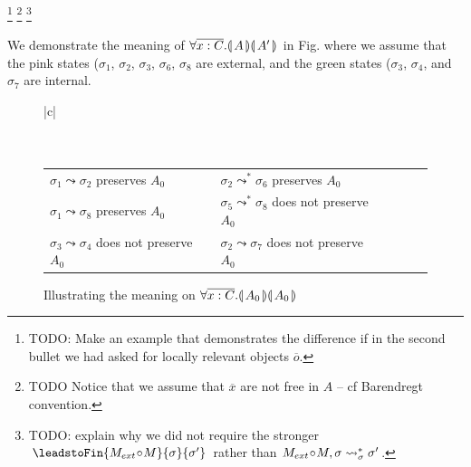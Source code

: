   
\footnote{{TODO: Make an example that demonstrates the difference if in the second bullet we had asked for locally relevant objects ${\overline o}$.}}
\footnote{{TODO Notice that we assume that $\overline x$ are not free in $A$ -- cf Barendregt convention.}}
\footnote{TODO: explain why we did not require the stronger $\leadstoFin{M_{ext}\!\circ \!M}{\sigma}{\sigma'}$ rather than $M_{ext}\!\circ \!M, \sigma \leadsto^*_{\sigma} \sigma'$.}



{We demonstrate the meaning of ${\forall {\overline {x:C}}.{\llparenthesis}\, A \,{\rrparenthesis}{\llparenthesis}\, A' \,{\rrparenthesis}}$ in Fig. where we assume that the pink states (\ie   ${\sigma_1}$, 
 ${\sigma_2}$,  ${\sigma_3}$,  ${\sigma_6}$,  ${\sigma_8}$ are external, and the green states (\ie   ${\sigma_3}$, 
 ${\sigma_4}$,  and ${\sigma_7}$ are internal.}
 
 \begin{figure}[htb]
\begin{tabular}{|c|}
\hline \\
\\
\hline
\\
\begin{tabular}{lclclcl} 
$ {\sigma_1} \leadsto  \sigma_2 $ preserves $A_0$ & &
$ {\sigma_2} \leadsto^*  \sigma_6 $ preserves $A_0$ \\
$ {\sigma_1} \leadsto  \sigma_8 $ preserves $A_0$ & &
$ {\sigma_5} \leadsto^* \sigma_8 $ does not preserve $A_0$\\
$ {\sigma_3} \leadsto  \sigma_4 $ does not preserve $A_0$ & &
$ {\sigma_2} \leadsto  \sigma_7 $ does not preserve $A_0$
\\
\hline
\end{tabular}
\end{tabular}
   \caption{Illustrating  the meaning on ${\forall {\overline {x:C}}.{\llparenthesis}\, A_0 \,{\rrparenthesis}{\llparenthesis}\, A_0 \,{\rrparenthesis}}$    }
   \label{fig:TwoStateSemantics}
 \end{figure}
 
